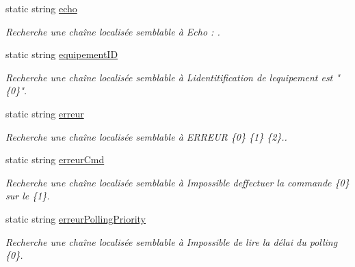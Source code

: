 \begin{DoxyCompactItemize}
static string \mbox{\hyperlink{class_device_library_1_1messages_text_a616c0d5ff9f3a4f77f95b8402e3d17b5}{echo}}
\begin{DoxyCompactList}\small\item\em Recherche une chaîne localisée semblable à Echo \+: . \end{DoxyCompactList}\item 
static string \mbox{\hyperlink{class_device_library_1_1messages_text_a2f05f0441e8bb2a403b65e2ed0839e2d}{equipement\+ID}}
\begin{DoxyCompactList}\small\item\em Recherche une chaîne localisée semblable à L\textquotesingle{}identitification de l\textquotesingle{}equipement est "\{0\}". \end{DoxyCompactList}\item 
static string \mbox{\hyperlink{class_device_library_1_1messages_text_a692ddbde572309d1f80363365fd514e9}{erreur}}
\begin{DoxyCompactList}\small\item\em Recherche une chaîne localisée semblable à E\+R\+R\+E\+UR \{0\} \{1\} \{2\}.. \end{DoxyCompactList}\item 
static string \mbox{\hyperlink{class_device_library_1_1messages_text_a9b8554d38ab9c2799d5405e2f894cf82}{erreur\+Cmd}}
\begin{DoxyCompactList}\small\item\em Recherche une chaîne localisée semblable à Impossible d\textquotesingle{}effectuer la commande \{0\} sur le \{1\}. \end{DoxyCompactList}\item 
static string \mbox{\hyperlink{class_device_library_1_1messages_text_a9bd55afe4b9caa13b0d861fc4c3ff24f}{erreur\+Polling\+Priority}}
\begin{DoxyCompactList}\small\item\em Recherche une chaîne localisée semblable à Impossible de lire la délai du polling \{0\}. \end{DoxyCompactList}\item 

\end{DoxyCompactItemize}

